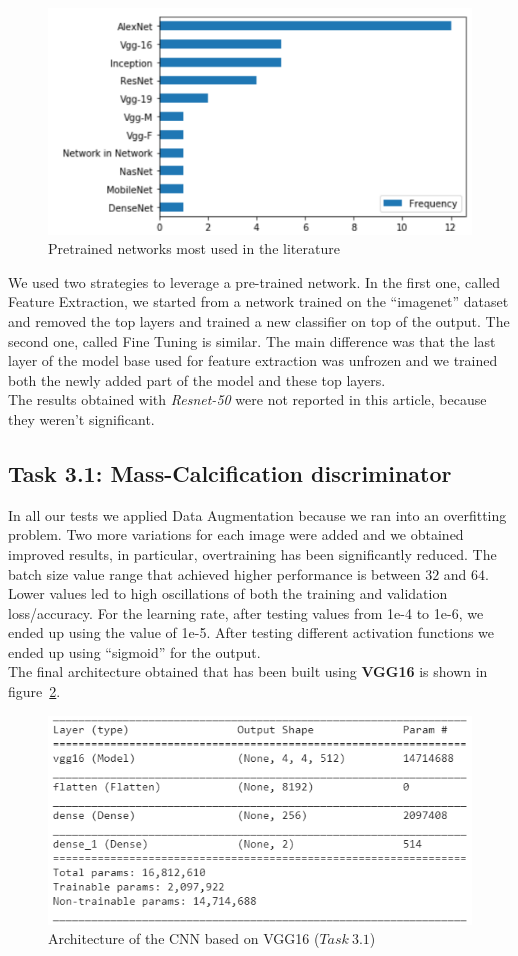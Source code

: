 \documentclass[11pt,a4paper,oneside]{article}
\begin{document}
\begin{figure}[h]
\centering
\includegraphics[width=.5\textwidth]{images/pretrained_networks}
\caption{Pretrained networks most used in the literature}
\label{fig:pretrained_networks}
\end{figure}

We used two strategies to leverage a pre-trained network. In the first one, called Feature Extraction, we started from a network trained on the “imagenet” dataset and removed the top layers and trained a new classifier on top of the output.
The second one, called Fine Tuning is similar. The main difference was that the last layer of the model base used for feature extraction was unfrozen and we trained both the newly added part of the model and these top layers. \\
The results obtained with \textit{Resnet-50} were not reported in this article, because they weren't significant.

\subsection{Task 3.1: Mass-Calcification discriminator}
In all our tests we applied Data Augmentation because we ran into an overfitting problem. Two more variations for each image were added and we obtained improved results, in particular, overtraining has been significantly reduced. The batch size value range that achieved higher performance is between $32$ and $64$. Lower values led to high oscillations of both the training and validation loss/accuracy. For the learning rate, after testing values from 1e-4 to 1e-6, we ended up using the value of 1e-5. After testing different activation functions we ended up using “sigmoid” for the output. \\

The final architecture obtained that has been built using \textbf{VGG16} is shown in figure~\ref{fig:vgg16_model}. 

\begin{figure}[h]
\centering
\includegraphics[width=.5\textwidth]{images/Task 3/VGG16 3.1/Model}
\caption{Architecture of the CNN based on VGG16 ($Task\ 3.1$)}
\label{fig:vgg16_model}
\end{figure}
\end{document}

